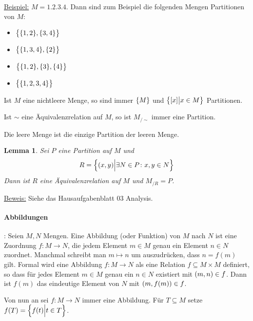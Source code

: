\documentclass{scrreprt}
\newtheorem*{lemma}{Lemma}
\begin{document}
\underline{Beispiel:} $M = \qty{1, 2, 3, 4}$.
Dann sind zum Beispiel die folgenden Mengen Partitionen von $M$:
\begin{multicols}{2}
  \begin{itemize}
  \item $\qty\big{\qty{1, 2}, \qty{3, 4}}$
  \item $\qty\big{\qty{1, 3, 4}, \qty{2}}$
  \item $\qty\big{\qty{1, 2}, \qty{3}, \qty{4}}$
  \item $\qty\big{\qty{1, 2, 3, 4}}$
  \end{itemize}
\end{multicols}

Ist $M$ eine nichtleere Menge, so sind immer $\qty{M}$ und
$\qty\big{\qty[x] {\big |} x \in M}$ Partitionen.

Ist $\sim$ eine Äquivalenzrelation auf $M$, so ist $M_{/\sim}$
immer eine Partition.

Die leere Menge ist die einzige Partition der leeren Menge.

\begin{lemma}
  Sei $P$ eine Partition auf $M$ und
  \[
    R = \qty\Big{ \qty(x, y) {\Big |} \exists N \in P \colon x, y \in N}
  \]
  Dann ist $R$ eine Äquivalenzrelation auf $M$ und $M_{/R} = P$.
\end{lemma}

\underline{Beweis:} Siehe das Hausaufgabenblatt 03 Analysis.

\paragraph{Abbildungen}:
Seien $M, N$ Mengen.
Eine Abbildung (oder Funktion) von $M$ nach $N$ ist eine Zuordnung
$f \colon M \to N$, die jedem Element $m \in M$ genau ein Element
$n \in N$ zuordnet.
Manchmal schreibt man $m \mapsto n$ um auszudrücken, dass $n = f(m)$ gilt.
Formal wird eine Abbildung $f \colon M \to N$ als eine Relation
$f \subseteq M \times M$ definiert, so dass für jedes Element $m \in M$
genau ein $n \in N$ existiert mit $\qty(m, n) \in f$.
Dann ist $f(m)$ das eindeutige Element von $N$ mit $\qty(m, f(m)) \in f$.

Von nun an sei $f \colon M \to N$ immer eine Abbildung.
Für $T \subseteq M$ setze $f(T) = \qty\Big{f(t) {\Big |} t \in T}$.
\end{document}

